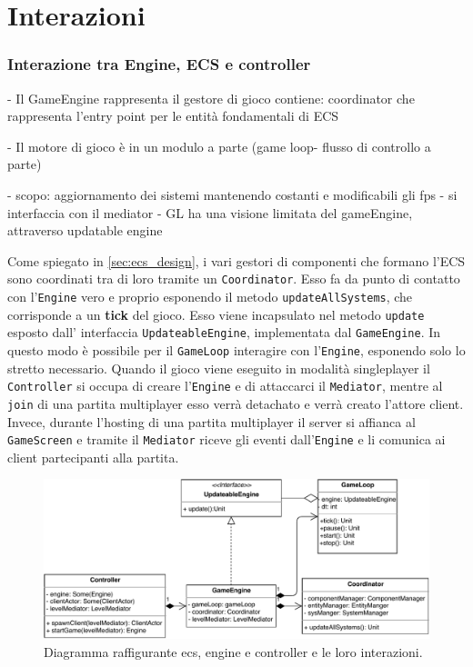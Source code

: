 \section{Interazioni}
\label{sec:interactions_design}

\subsubsection{Interazione tra Engine, ECS e controller}

- Il GameEngine rappresenta il gestore di gioco contiene:
coordinator che rappresenta l'entry point per le entità fondamentali di ECS

- Il motore di gioco è in un modulo a parte (game loop- flusso di controllo a parte)

- scopo: aggiornamento dei sistemi mantenendo costanti e modificabili gli fps
- si interfaccia con il mediator
- GL ha una visione limitata del gameEngine, attraverso updatable engine 




Come spiegato in \ref{sec:ecs_design}, i vari gestori di componenti che formano l'ECS sono coordinati tra di loro tramite un \texttt{Coordinator}. Esso fa da punto di contatto con l'\texttt{Engine} vero e proprio esponendo il metodo \texttt{updateAllSystems}, che corrisponde a un \textbf{tick} del gioco. Esso viene incapsulato nel metodo \texttt{update} esposto dall' interfaccia \texttt{UpdateableEngine}, implementata dal \texttt{GameEngine}. In questo modo è possibile per il \texttt{GameLoop} interagire con l'\texttt{Engine}, esponendo solo lo stretto necessario.
Quando il gioco viene eseguito in modalità singleplayer il \texttt{Controller} si occupa di creare l'\texttt{Engine} e di attaccarci il \texttt{Mediator}, mentre al \texttt{join} di una partita multiplayer esso verrà detachato e verrà creato l'attore client. Invece, durante l'hosting di una partita multiplayer il server si affianca al \texttt{GameScreen} e tramite il \texttt{Mediator} riceve gli eventi dall'\texttt{Engine} e li comunica ai client partecipanti alla partita.
\begin{figure}[H]
	\centering
	\includegraphics[width=\columnwidth]{drawio/ECS-engine-controller/ecs-engine-controller.pdf}
	\caption{Diagramma raffigurante ecs, engine e controller e le loro interazioni.}
	\label{fig:ecs-engine-controller}
\end{figure}



